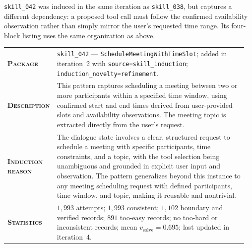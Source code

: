 \texttt{skill\_042} was induced in the same iteration as \texttt{skill\_038}, but captures a different dependency: a proposed tool call must follow the confirmed availability observation rather than simply mirror the user's requested time range. Its four-block listing uses the same organization as above.

\begin{table}[htbp]
\centering
\begin{minipage}{0.97\textwidth}
\raggedright
\small
\setlength{\tabcolsep}{3pt}
\renewcommand{\arraystretch}{1.16}
\vspace{0.35em}
\begin{tabular}{@{}>{\raggedright\arraybackslash\bfseries}p{0.17\linewidth} >{\raggedright\arraybackslash}p{0.79\linewidth}@{}}
    \textsc{Package} & \texttt{skill\_042} --- \texttt{ScheduleMeetingWithTimeSlot}; added in iteration~2 with \texttt{source=skill\_induction}; \texttt{induction\_novelty=refinement}. \\
    \textsc{Description} & This pattern captures scheduling a meeting between two or more participants within a specified time window, using confirmed start and end times derived from user-provided slots and availability observations. The meeting topic is extracted directly from the user's request. \\
    \textsc{Induction reason} & The dialogue state involves a clear, structured request to schedule a meeting with specific participants, time constraints, and a topic, with the tool selection being unambiguous and grounded in explicit user input and observation. The pattern generalizes beyond this instance to any meeting scheduling request with defined participants, time window, and topic, making it reusable and nontrivial. \\
    \textsc{Statistics} & $1{,}993$ attempts; $1{,}993$ consistent; $1{,}102$ boundary and verified records; $891$ too-easy records; no too-hard or inconsistent records; mean $v_\text{solve}=0.695$; last updated in iteration~4. \\
\end{tabular}
\vspace{0.45em}
\end{minipage}
\end{table}


